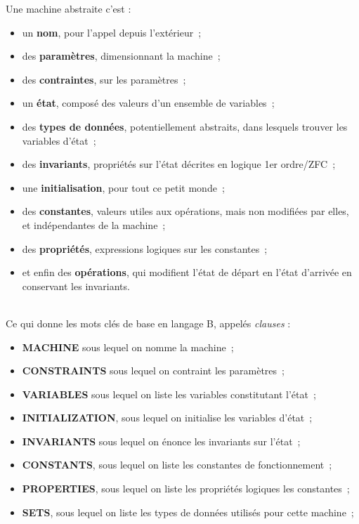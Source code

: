 \documentclass[10pt,a4paper]{article}
\begin{document}
Une machine abstraite c'est :
\\
\begin{itemize}
\item un \textbf{nom}, pour l'appel depuis l'extérieur~;
\\
\item des \textbf{paramètres}, dimensionnant la machine~;
\item des \textbf{contraintes}, sur les paramètres~;
\\
\item un \textbf{état}, composé des valeurs d'un ensemble de variables~;
\item des \textbf{types de données}, potentiellement abstraits, dans lesquels trouver les variables d'état~;
\item des \textbf{invariants}, propriétés sur l'état décrites en logique 1er ordre/ZFC~;
\item une \textbf{initialisation}, pour tout ce petit monde~;
\\
\item des \textbf{constantes}, valeurs utiles aux opérations, mais non modifiées par elles, et indépendantes de la machine~;
\item des \textbf{propriétés}, expressions logiques sur les constantes~;
\\
\item et enfin des \textbf{opérations}, qui modifient l'état de départ en l'état d'arrivée en conservant les invariants.
\end{itemize}
\ \\
Ce qui donne les mots clés de base en langage B, appelés \emph{clauses} :
\begin{itemize}
\item \textbf{MACHINE} sous lequel on nomme la machine~;
\item \textbf{CONSTRAINTS} sous lequel on contraint les paramètres~;
\item \textbf{VARIABLES} sous lequel on liste les variables constitutant l'état~;
\item \textbf{INITIALIZATION}, sous lequel on initialise les variables d'état~;
\item \textbf{INVARIANTS} sous lequel on énonce les invariants sur l'état~;
\item \textbf{CONSTANTS}, sous lequel on liste les constantes de fonctionnement~;
\item \textbf{PROPERTIES}, sous lequel on liste les propriétés logiques les constantes~;
\item \textbf{SETS}, sous lequel on liste les types de données utilisés pour cette machine~;
\end{itemize}
\end{document}
